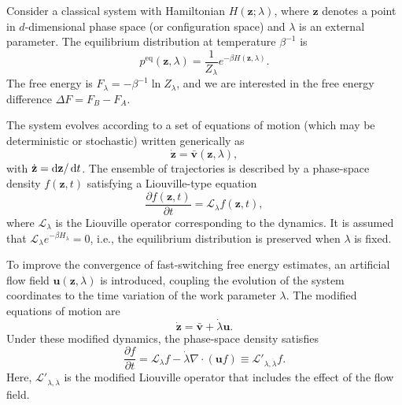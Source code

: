 Consider a classical system with Hamiltonian $H(\mathbf{z};\lambda)$, where $\mathbf{z}$ denotes a point in $d$-dimensional phase space (or configuration space) and $\lambda$ is an external parameter. The equilibrium distribution at temperature $\beta^{-1}$ is
\begin{equation}
	p^{\text{eq}}(\mathbf{z},\lambda) = \frac{1}{Z_\lambda} e^{-\beta H(\mathbf{z},\lambda)}.
\end{equation}
The free energy is $F_\lambda = -\beta^{-1} \ln Z_\lambda$, and we are interested in the free energy difference $\Delta F = F_B - F_A$.

The system evolves according to a set of equations of motion (which may be deterministic or stochastic) written generically as
\begin{equation}
	\dot{\mathbf{z}} = \bar{\mathbf{v}}(\mathbf{z},\lambda),
\end{equation}
with $\dot{\mathbf{z}} = \mathop{}\!\mathrm{d} \mathbf{z}/\mathop{}\!\mathrm{d} t$. The ensemble of trajectories is described by a phase-space density $f(\mathbf{z},t)$ satisfying a Liouville-type equation
\begin{equation}
	\frac{\partial f(\mathbf{z},t)}{\partial t} = \mathcal{L}_\lambda f(\mathbf{z},t),
\end{equation}
where $\mathcal{L}_\lambda$ is the Liouville operator corresponding to the dynamics. It is assumed that $\mathcal{L}_\lambda e^{-\beta H_\lambda} = 0$, i.e., the equilibrium distribution is preserved when $\lambda$ is fixed.

To improve the convergence of fast-switching free energy estimates, an artificial flow field $\mathbf{u}(\mathbf{z},\lambda)$ is introduced, coupling the evolution of the system coordinates to the time variation of the work parameter $\lambda$. The modified equations of motion are
\begin{equation}
	\dot{\mathbf{z}} = \bar{\mathbf{v}} + \dot{\lambda} \mathbf{u}. 
\end{equation}
Under these modified dynamics, the phase-space density satisfies
\begin{equation}
	\frac{\partial f}{\partial t} = \mathcal{L}_\lambda f - \dot{\lambda} \nabla \cdot (\mathbf{u} f) \equiv \mathcal{L}'_{\lambda,\dot{\lambda}} f. \label{Eq:FEM:NEW:LiouvilleEq}
\end{equation}
Here, $\mathcal{L}'_{\lambda,\dot{\lambda}}$ is the modified Liouville operator that includes the effect of the flow field.


